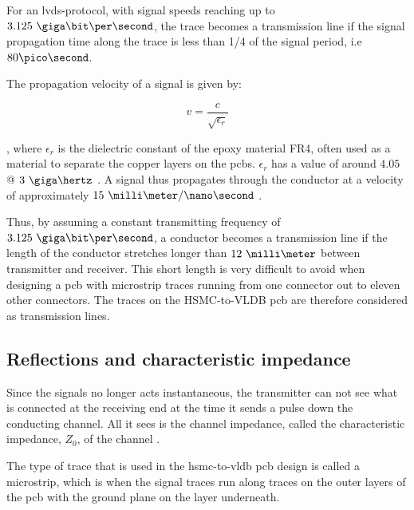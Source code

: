 \documentclass[main.tex]{subfiles}
\begin{document}
For an \gls{lvds}-protocol, with signal speeds reaching up to $3.125\ \giga\bit\per\second$, the trace becomes a transmission line if the signal propagation time along the trace is less than 1/4 of the signal period, i.e $80\pico\second$. 

The propagation velocity of a signal is given by:

\begin{equation}
    v = \frac{c}{\sqrt{\epsilon_r}}
\end{equation}

, where $\epsilon_r$ is the dielectric constant of the epoxy material FR4, often used as a material to separate the copper layers on the \glspl{pcb}. $\epsilon_r$ has a value of around $4.05$ @ $3\ \giga\hertz$ \cite{polar15}.
A signal thus propagates through the conductor at a velocity of approximately $15\ \milli\meter/\nano\second$ \cite[example 13.7]{weste11}.

Thus, by assuming a constant transmitting frequency of $3.125\ \giga\bit\per\second$, a conductor becomes a transmission line if the length of the conductor stretches longer than $12\ \milli\meter$ between transmitter and receiver. This short length is very difficult to avoid when designing a \gls{pcb} with microstrip traces running from one connector out to eleven other connectors. The traces on the HSMC-to-VLDB \gls{pcb} are therefore considered as transmission lines. 

\subsection{Reflections and characteristic impedance}

Since the signals no longer acts instantaneous, the transmitter can not see what is connected at the receiving end at the time it sends a pulse down the conducting channel. All it sees is the channel impedance, called the characteristic impedance, $Z_0$, of the channel \cite{weste11}.

The type of trace that is used in the \gls{hsmc}-to-\gls{vldb} \gls{pcb} design is called a microstrip, which is when the signal traces run along traces on the outer layers of the \gls{pcb} with the ground plane on the layer underneath. 

\end{document}
